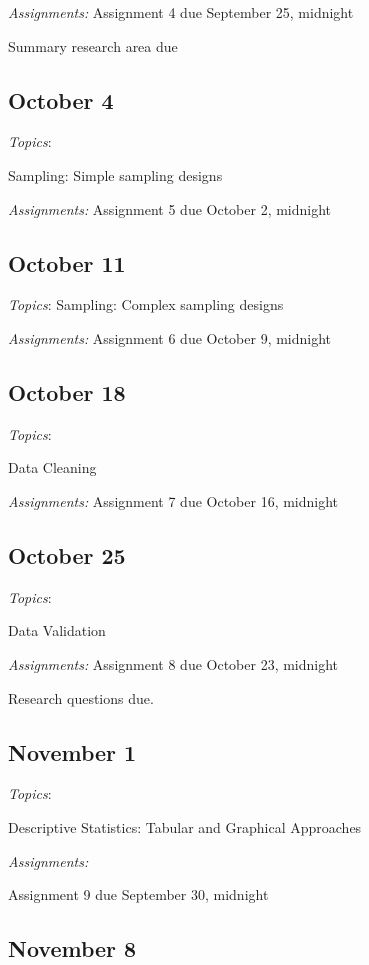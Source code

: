 \documentclass[12pt]{article}
\begin{document}
\begin{flushleft}
\textit {Assignments:}
Assignment 4 due September 25, midnight

Summary research area due

\subsection{October 4}


\textit{Topics}:

Sampling: Simple sampling designs

\textit {Assignments:}
Assignment 5 due October 2, midnight
\subsection{October 11}


\textit{Topics}:
Sampling: Complex sampling designs


\textit {Assignments:}
Assignment 6 due October 9, midnight
\subsection{October 18}


\textit{Topics}:

Data Cleaning

\textit {Assignments:}
Assignment 7 due October 16, midnight

\subsection{October 25}


\textit{Topics}:

Data Validation

\textit {Assignments:}
Assignment 8 due October 23, midnight

Research questions due. 

\subsection{November 1}


\textit{Topics}:

Descriptive Statistics: Tabular and Graphical Approaches

\textit {Assignments:}

Assignment 9 due September 30, midnight

\subsection{November 8}



\end{flushleft}
\end{document}
